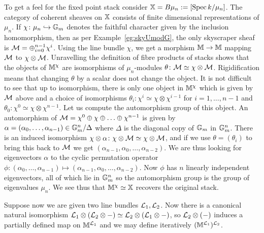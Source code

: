 \documentclass[12pt]{amsart}
\begin{document}
\begin{example} \label{eg:BmuRecovery}
To get a feel for the fixed point stack consider $\mathbb{X} = B\mu_n := [\operatorname{Spec} k / \mu_n]$. The category of coherent sheaves on $\mathbb{X}$ consists of finite dimensional representations of $\mu_n$. If $\chi \colon \mu_n \hookrightarrow \mathbb{G}_m$ denotes the faithful character given by the inclusion homomorphism, then as per Example~\ref{eg:skyUmodG}, the only skyscraper sheaf is $\mathcal{M} = \oplus_{i=0}^{n-1}\chi^i$. Using the line bundle $\chi$, we get a morphism $\mathbb{M} \to \mathbb{M}$ mapping $\mathcal{M}$ to $\chi \otimes \mathcal{M}$. Unravelling the definition of fibre products of stacks shows that the objects of $\mathbb{M}^{\chi}$ are isomorphisms of $\mu_n$-modules $\theta \colon \mathcal{M} \simeq \chi \otimes \mathcal{M}$. Rigidification means that changing $\theta$ by a scalar does not change the object. It is not difficult to see that up to isomorphism, there is only one object in $\mathbb{M}^{\chi}$ which is given by $\mathcal{M}$ above and a choice of isomorphisms $\theta_i \colon \chi^i \simeq \chi \otimes \chi^{i-1}$ for $i = 1, \ldots, n-1$ and $\theta_0 \colon \chi^0 \simeq \chi \otimes \chi^{n-1}$. Let us compute the automorphism group of this object. An automorphism of $\mathcal{M} = \chi^0 \oplus \chi \oplus \ldots \oplus \chi^{n-1}$ is given by $\alpha = (\alpha_0,\ldots, \alpha_{n-1}) \in \mathbb{G}_m^n/\Delta$ where $\Delta$ is the diagonal copy of $\mathbb{G}_m$ in $\mathbb{G}_m^n$. There is an induced isomorphism $\chi \otimes \alpha \colon \chi \otimes \mathcal{M} \simeq \chi \otimes \mathcal{M}$, and if we use $\theta = (\theta_i)$ to  bring this back to $\mathcal{M}$ we get $(\alpha_{n-1}, \alpha_0, \ldots , \alpha_{n-2})$. We are thus looking for eigenvectors $\alpha$ to  the cyclic permutation operator $\phi \colon (\alpha_0,\ldots, \alpha_{n-1}) \mapsto (\alpha_{n-1}, \alpha_0, \ldots , \alpha_{n-2})$. Now $\phi$ has $n$ linearly independent eigenvectors, all of which lie in $\mathbb{G}_m^n$ so the automorphism group is the group of eigenvalues $\mu_n$. We see thus that $\mathbb{M}^{\chi} \simeq \mathbb{X}$ recovers the original stack. 
\end{example}



Suppose now we are given two line bundles $\mathcal{L}_1,\mathcal{L}_2$. Now there is a canonical natural isomorphism $\mathcal{L}_1 \otimes (\mathcal{L}_2 \otimes -) \simeq \mathcal{L}_2 \otimes (\mathcal{L}_1 \otimes -)$, so $\mathcal{L}_2 \otimes (-)$ induces a partially defined map on $\mathbb{M}^{\mathcal{L}_1}$ and we may define iteratively $(\mathbb{M}^{\mathcal{L}_1})^{\mathcal{L}_2}$. 
\end{document}
